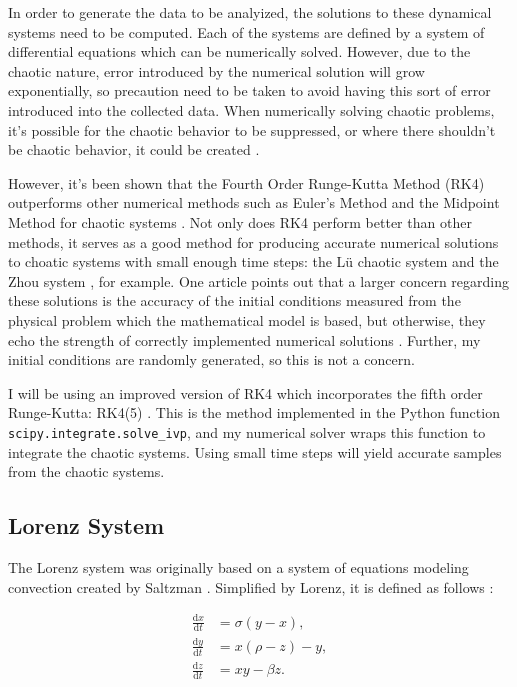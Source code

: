 \documentclass{article}
\newcommand{\der}[2][t]{\frac{\mathrm{d}#2}{\mathrm{d}#1}}
\begin{document}
In order to generate the data to be analyized, the solutions to these 
dynamical systems need to be computed. Each of the systems are defined by 
a system of differential equations which can be numerically solved. 
However, due to the chaotic nature, error introduced by the numerical 
solution will grow exponentially, so precaution need to be taken to avoid 
having this sort of error introduced into the collected data. When 
numerically solving chaotic problems, it's possible for the chaotic 
behavior to be suppressed, or where there shouldn't be chaotic behavior,
it could be created \cite{corless1994good}.

However, it's been shown that the Fourth Order Runge-Kutta Method (RK4)
outperforms other numerical methods such as Euler's Method and the
Midpoint Method for chaotic systems \cite{zidan2011effect}.
Not only does RK4 perform better than other methods, it serves as a good
method for producing accurate numerical solutions to choatic systems with 
small enough time steps: the Lü chaotic system \cite{mehdi2017using} and
the Zhou system \cite{roslan2013solving}, for example. One article points
out that a larger concern 
regarding these solutions is the accuracy of the initial conditions 
measured from the physical problem which the mathematical model is based,
but otherwise, they echo the strength of correctly implemented 
numerical solutions \cite{corless1994good}. Further, my initial conditions
are randomly generated, so this is not a concern.

I will be using an improved version of RK4 which
incorporates the fifth order Runge-Kutta: RK4(5)
\cite{dormand1980family}. This is the method implemented in
the Python function \texttt{scipy.integrate.solve\_ivp}, and my
numerical solver
wraps this function to integrate the chaotic systems. Using small time
steps will yield accurate samples from the chaotic systems.

\subsection{Lorenz System}
\label{sec:lorenz}

The Lorenz system was originally based on a system of equations modeling
convection created by Saltzman \cite{lorenz1963deterministic}
\cite{saltzman1962finite}. Simplified by Lorenz, it is defined as follows
\cite{lorenz1963deterministic}:

\begin{align}
    \der{x} &= \sigma (y - x), \nonumber \\
    \der{y} &= x (\rho - z) - y, \nonumber \\
    \der{z} &= x y - \beta z. \label{eq:lorenz_equation}
\end{align}
\end{document}
